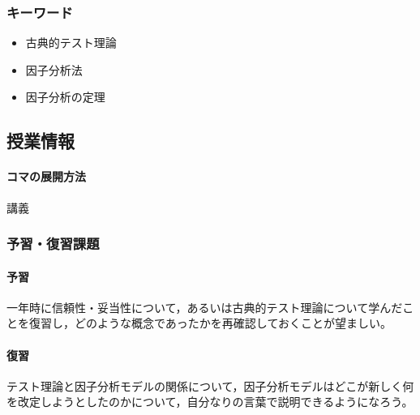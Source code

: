 \subsubsection{キーワード}
\begin{itemize}
\item 古典的テスト理論
\item 因子分析法
\item 因子分析の定理
\end{itemize}
\subsection{授業情報}
\paragraph{コマの展開方法}
講義
\subsubsection{予習・復習課題}
\paragraph{予習}一年時に信頼性・妥当性について，あるいは古典的テスト理論について学んだことを復習し，どのような概念であったかを再確認しておくことが望ましい。
\paragraph{復習}テスト理論と因子分析モデルの関係について，因子分析モデルはどこが新しく何を改定しようとしたのかについて，自分なりの言葉で説明できるようになろう。
